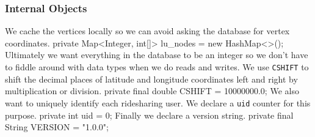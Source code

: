 \documentclass{article}
\def\nwendcode{\endtrivlist \endgroup}
\let\nwdocspar=\par
\theoremstyle{definition}
\begin{document}
\subsubsection{Internal Objects}
\label{sec:internal-objects}
We cache the vertices locally so we can avoid asking the database for
vertex coordinates.
\nwenddocs{}\endmoddef{}
private Map<Integer, int[]> lu_nodes = new HashMap<>();
\eatline
{}\nwendcode{}Ultimately we want everything in the database to be an integer so we don't have
to fiddle around with data types when we do reads and writes. We use {\tt{}\protect{}CSHIFT}
to shift the decimal places of latitude and longitude coordinates left and
right by multiplication or division.
\nwenddocs{}\plusendmoddef
private final double CSHIFT = 10000000.0;
\eatline
{}\nwendcode{}We also want to uniquely identify each ridesharing user. We declare a
{\tt{}\protect{}uid} counter for this purpose.
\nwenddocs{}\plusendmoddef
private int uid = 0;
\eatline
{}\nwendcode{}Finally we declare a version string.
\nwenddocs{}\plusendmoddef
private final String VERSION = "1.0.0";
\eatline
{}\nwendcode{}\nwdocspar
\end{document}
